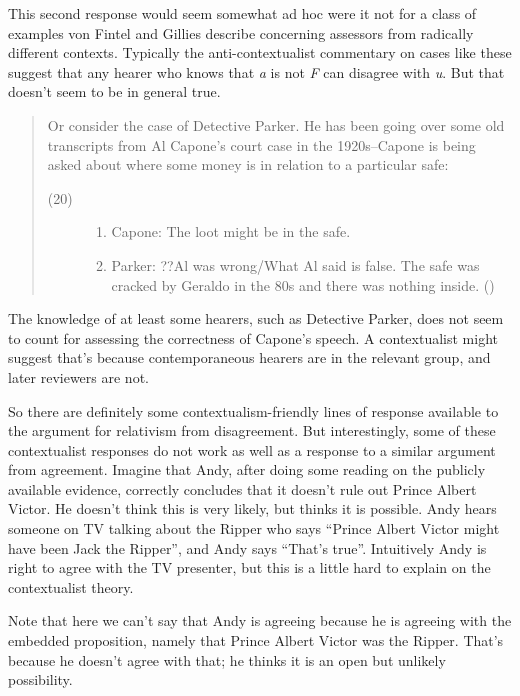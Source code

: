 \documentclass[
  11pt,
  letterpaper,
  DIV=11,
  numbers=noendperiod,
  twoside]{scrartcl}
\begin{document}
This second response would seem somewhat ad hoc were it not for a class
of examples von Fintel and Gillies describe concerning assessors from
radically different contexts. Typically the anti-contextualist
commentary on cases like these suggest that any hearer who knows that
\emph{a} is not \emph{F} can disagree with \emph{u}. But that doesn't
seem to be in general true.

\begin{quote}
Or consider the case of Detective Parker. He has been going over some
old transcripts from Al Capone's court case in the 1920s--Capone is
being asked about where some money is in relation to a particular safe:

\begin{description}
\item[(20)]
\hfill
\begin{enumerate}
\def\labelenumi{\arabic{enumi}.}
\item
  Capone: The loot might be in the safe.
\item
  Parker: ??Al was wrong/What Al said is false. The safe was cracked by
  Geraldo in the 80s and there was nothing inside.
  ()
\end{enumerate}
\end{description}
\end{quote}

The knowledge of at least some hearers, such as Detective Parker, does
not seem to count for assessing the correctness of Capone's speech. A
contextualist might suggest that's because contemporaneous hearers are
in the relevant group, and later reviewers are not.

So there are definitely some contextualism-friendly lines of response
available to the argument for relativism from disagreement. But
interestingly, some of these contextualist responses do not work as well
as a response to a similar argument from agreement. Imagine that Andy,
after doing some reading on the publicly available evidence, correctly
concludes that it doesn't rule out Prince Albert Victor. He doesn't
think this is very likely, but thinks it is possible. Andy hears someone
on TV talking about the Ripper who says ``Prince Albert Victor might
have been Jack the Ripper'', and Andy says ``That's true''. Intuitively
Andy is right to agree with the TV presenter, but this is a little hard
to explain on the contextualist theory.

Note that here we can't say that Andy is agreeing because he is agreeing
with the embedded proposition, namely that Prince Albert Victor was the
Ripper. That's because he doesn't agree with that; he thinks it is an
open but unlikely possibility.
\end{document}
